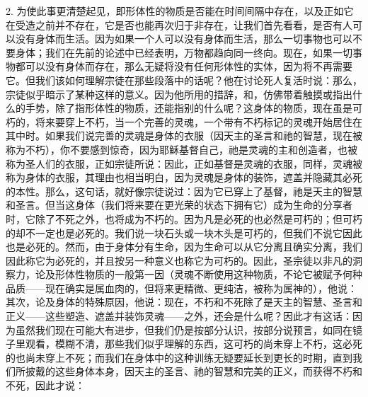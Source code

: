 2. 为使此事更清楚起见，即形体性的物质是否能在时间间隔中存在，以及正如它在受造之前并不存在，它是否也能再次归于非存在，让我们首先看看，是否有人可以没有身体而生活。因为如果一个人可以没有身体而生活，那么一切事物也可以不要身体；我们在先前的论述中已经表明，万物都趋向同一终向。\newline{}现在，如果一切事物都可以没有身体而存在，那么无疑将没有任何形体性的实体，因为将不再需要它。但我们该如何理解宗徒在那些段落中的话呢？他在讨论死人复活时说：\newline{}那么，宗徒似乎暗示了某种这样的意义。因为他所用的措辞，和，仿佛带着触摸或指出什么的手势，除了指形体性的物质，还能指别的什么呢？这身体的物质，现在虽是可朽的，将来要穿上不朽，当一个完善的灵魂，一个带有不朽标记的灵魂开始居住在其中时。\newline{}如果我们说完善的灵魂是身体的衣服（因天主的圣言和祂的智慧，现在被称为不朽），你不要感到惊奇，因为耶稣基督自己，祂是灵魂的主和创造者，也被称为圣人们的衣服，正如宗徒所说：因此，正如基督是灵魂的衣服，同样，灵魂被称为身体的衣服，其理由也相当明白，因为灵魂是身体的装饰，遮盖并隐藏其必死的本性。\newline{}那么，这句话，就好像宗徒说过：因为它已穿上了基督，祂是天主的智慧和圣言。但当这身体（我们将来要在更光荣的状态下拥有它）成为生命的分享者时，它除了不死之外，也将成为不朽的。因为凡是必死的也必然是可朽的；但可朽的却不一定也是必死的。我们说一块石头或一块木头是可朽的，但我们不说它因此也是必死的。然而，由于身体分有生命，因为生命可以从它分离且确实分离，我们因此称它为必死的，并且按另一种意义也称它为可朽的。\newline{}因此，圣宗徒以非凡的洞察力，论及形体性物质的一般第一因（灵魂不断使用这种物质，不论它被赋予何种品质——现在确实是属血肉的，但将来更精微、更纯洁，被称为属神的），他说：其次，论及身体的特殊原因，他说：现在，不朽和不死除了是天主的智慧、圣言和正义——这些塑造、遮盖并装饰灵魂——之外，还会是什么呢？因此才有这话：因为虽然我们现在可能大有进步，但我们仍是按部分认识，按部分说预言，如同在镜子里观看，模糊不清，那些我们似乎理解的东西，这可朽的尚未穿上不朽，这必死的也尚未穿上不死；而我们在身体中的这种训练无疑要延长到更长的时期，直到我们所披戴的这些身体本身，因天主的圣言、祂的智慧和完美的正义，而获得不朽和不死，因此才说：\par

